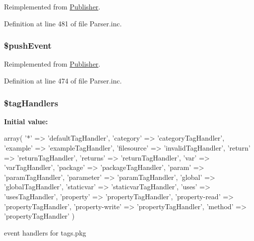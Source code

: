 \-Reimplemented from \hyperlink{class_publisher_a12bfa5a88d0884472fa0aa48d7b48ab7}{\-Publisher}.



\-Definition at line 481 of file \-Parser.\-inc.

\hypertarget{class_parser_afa3ebd7022a716d664b6e3bae77e0e4c}{
\subsubsection[{\$push\-Event}]{\setlength{\rightskip}{0pt plus 5cm}\$push\-Event}}\label{class_parser_afa3ebd7022a716d664b6e3bae77e0e4c}


\-Reimplemented from \hyperlink{class_publisher_afa3ebd7022a716d664b6e3bae77e0e4c}{\-Publisher}.



\-Definition at line 474 of file \-Parser.\-inc.

\hypertarget{class_parser_a29ffc8e33fce7331212a7636256a7678}{
\subsubsection[{\$tag\-Handlers}]{\setlength{\rightskip}{0pt plus 5cm}\$tag\-Handlers}}\label{class_parser_a29ffc8e33fce7331212a7636256a7678}
{\bfseries \-Initial value\-:}
\begin{DoxyCode}
 array(
                                '*' => 'defaultTagHandler',
                                'category' => 'categoryTagHandler',
                                'example' => 'exampleTagHandler',
                                'filesource' => 'invalidTagHandler',
                                'return' => 'returnTagHandler',
                                'returns' => 'returnTagHandler',
                                'var' => 'varTagHandler',
                                'package' => 'packageTagHandler',
                                'param' => 'paramTagHandler',
                                'parameter' => 'paramTagHandler',
                                'global' => 'globalTagHandler',
                                'staticvar' => 'staticvarTagHandler',
                                'uses' => 'usesTagHandler',
                                'property' => 'propertyTagHandler',
                                'property-read' => 'propertyTagHandler',
                                'property-write' => 'propertyTagHandler',
                                'method' => 'propertyTagHandler'
                            )
\end{DoxyCode}
event handlers for   tags.\-pkg 

